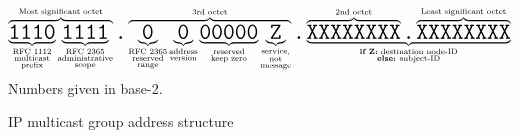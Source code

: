 \begin{figure}[H]
    \centering
    $$
    \overbrace{
        \underbrace{
            \texttt{\huge{1110}}
        }_{\substack{\text{RFC~1112} \\ \text{multicast} \\ \text{prefix}}}%
        \underbrace{
            \texttt{\huge{1111}}
        }_{\substack{\text{RFC~2365} \\ \text{administrative} \\ \text{scope}}}%
    }^{\text{Most significant octet}}%
    \texttt{\huge{.}}%
    \overbrace{
        \underbrace{
            \texttt{\huge{0}}
        }_{\substack{\text{RFC~2365} \\ \text{reserved} \\ \text{range}}}%
        \underbrace{
            \texttt{\huge{0}}
        }_{\substack{\text{address} \\ \text{version}}}%
        \underbrace{
            \texttt{\huge{00000}}
        }_{\substack{\text{reserved} \\ \text{keep zero}}}%
        \underbrace{
            \texttt{\huge{Z}}
        }_{\substack{\text{service,} \\ \text{not} \\ \text{message}}}%
    }^{\text{3rd octet}}%
    \texttt{\huge{.}}%
    \underbrace{
        \overbrace{\texttt{\huge{XXXXXXXX}}}^{\text{2nd octet}}
        \texttt{\huge{.}}
        \overbrace{\texttt{\huge{XXXXXXXX}}}^{\text{Least significant octet}}
    }_{\substack{\text{\textbf{if Z:} destination node-ID} \\ \text{\textbf{else:} subject-ID}}}%
    $$
    Numbers given in base-2.
    \caption{IP multicast group address structure\label{fig:transport_udp_multicast_group_address}}
\end{figure}

